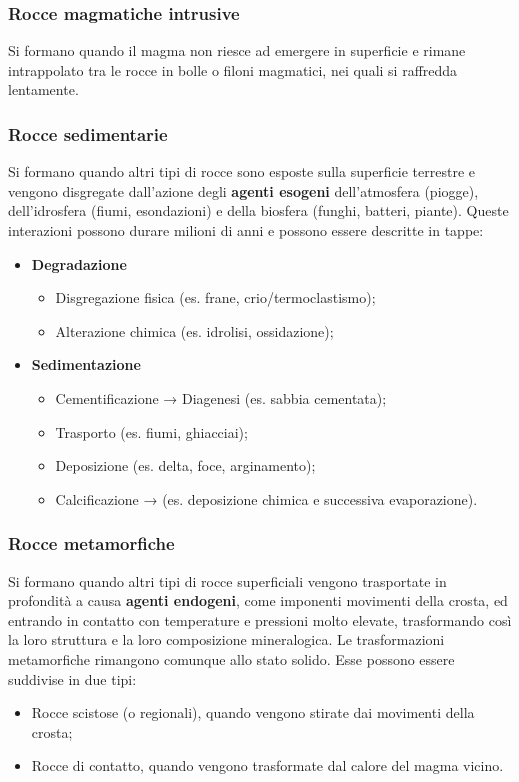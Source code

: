 \documentclass{article}
\begin{document}
\subsubsection{Rocce magmatiche intrusive}
Si formano quando il magma non riesce ad emergere in superficie e rimane intrappolato tra le
rocce in bolle o filoni magmatici, nei quali si raffredda lentamente.

\subsubsection{Rocce sedimentarie}
Si formano quando altri tipi di rocce sono esposte sulla superficie terrestre e vengono
disgregate dall'azione degli \textbf{agenti esogeni} dell'atmosfera (piogge), dell'idrosfera
(fiumi, esondazioni) e della biosfera (funghi, batteri, piante). Queste interazioni possono
durare milioni di anni e possono essere descritte in tappe:
\begin{itemize}
    \item \textbf{Degradazione}
    \begin{itemize}
        \item Disgregazione fisica (es. frane, crio/termoclastismo);
        \item Alterazione chimica (es. idrolisi, ossidazione);
    \end{itemize}
    \item \textbf{Sedimentazione}
    \begin{itemize}
        \item Cementificazione → Diagenesi (es. sabbia cementata);
        \item Trasporto (es. fiumi, ghiacciai);
        \item Deposizione (es. delta, foce, arginamento);
        \item Calcificazione → (es. deposizione chimica e successiva evaporazione).
    \end{itemize}
\end{itemize}

\subsubsection{Rocce metamorfiche}
Si formano quando altri tipi di rocce superficiali vengono trasportate in profondità a causa
\textbf{agenti endogeni}, come imponenti movimenti della crosta, ed entrando in contatto con
temperature e pressioni molto elevate, trasformando così la loro struttura e la loro
composizione mineralogica. Le trasformazioni metamorfiche rimangono comunque allo stato solido.
Esse possono essere suddivise in due tipi:
\begin{itemize}
    \item Rocce scistose (o regionali), quando vengono stirate dai movimenti della crosta;
    \item Rocce di contatto, quando vengono trasformate dal calore del magma vicino.
\end{itemize}
\end{document}
